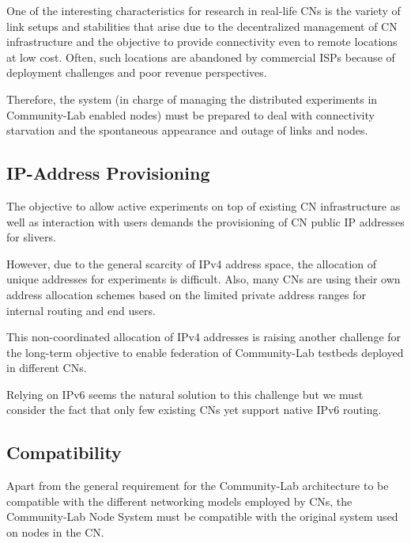 \documentclass[conference]{IEEEtran}
\begin{document}
One of the interesting characteristics for research in real-life CNs
is the variety of link setups and stabilities that arise due to the
decentralized management of CN infrastructure and the objective to provide
connectivity even to remote locations at low cost. Often, such
locations are abandoned by commercial ISPs because of deployment
challenges and poor revenue perspectives.

Therefore, the system (in charge of managing the distributed
experiments in Community-Lab enabled nodes) must be prepared to deal with
connectivity starvation and the spontaneous appearance and outage of
links and nodes.


\subsection{IP-Address Provisioning}

The objective to allow active experiments on top of existing CN
infrastructure as well as interaction with users demands the
provisioning of CN public IP addresses for slivers.

However, due to the general scarcity of IPv4 address space, the
allocation of unique addresses for experiments is difficult. Also,
many CNs are using their own address allocation schemes based on the
limited private address ranges for internal routing and end users.

This non-coordinated allocation of IPv4 addresses is raising another
challenge for the long-term objective to enable federation of Community-Lab
testbeds deployed in different CNs.

Relying on IPv6 seems the natural solution to this challenge but we must
consider the fact that only few existing CNs yet support native IPv6
routing.

\subsection{Compatibility}

Apart from the general requirement for the Community-Lab architecture to be
compatible with the different networking models employed by CNs, the
Community-Lab Node System must be compatible with the original system used on
nodes in the CN.
\end{document}
